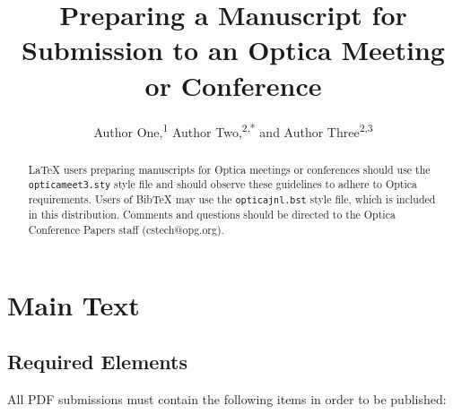 \documentclass[letterpaper,10pt]{article}
\newcommand\authormark[1]{\textsuperscript{#1}}
\begin{document}
\title{Preparing a Manuscript for Submission to an Optica Meeting or Conference}


\author{Author One,\authormark{1} Author Two,\authormark{2,*} and Author Three\authormark{2,3}}

\address{\authormark{1} Publications Department, Optica Publishing Group, 2010 Massachusetts Avenue NW, Washington, DC 20036\\
\authormark{2}Publications Department, Optica Publishing Group, 2010 Massachusetts Avenue NW, Washington, DC 20036\\
\authormark{3}Currently with the Department of Electronic Journals, Optica Publishing Group, 2010 Massachusetts Avenue NW, Washington, DC 20036}

\email{\authormark{*}opex@optica.org} %



\begin{abstract}
\LaTeX{} users preparing manuscripts for Optica meetings or conferences
should use  the \texttt{opticameet3.sty} style file and should observe these
guidelines to adhere to Optica requirements. Users of Bib\TeX{} may use the \texttt{opticajnl.bst} style file, which is included in this distribution. Comments and questions should be directed to the Optica Conference Papers staff (cstech@opg.org).
\end{abstract}

\section{Main Text}

\subsection{Required Elements}
All PDF submissions must contain the following items in order to be published:
\end{document}
